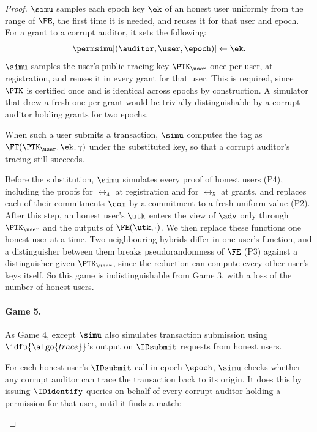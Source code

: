 \begin{proof}
  $\simu$ samples each epoch key $\ek$ of an honest user uniformly from the
range of $\FE$, the first time it is needed, and reuses it for that user and
epoch. For a grant to a corrupt auditor, it sets the following:
  \begin{equation*}
    \permsimu[(\auditor,\user,\epoch)] \leftarrow \ek.
  \end{equation*}
  $\simu$ samples the user's public tracing key $\PTK_\user$ once per user, at
registration, and reuses it in every grant for that user. This is required, since
$\PTK$ is certified once and is identical across epochs by construction. A
simulator that drew a fresh one per grant would be trivially distinguishable by a
corrupt auditor holding grants for two epochs.

  When such a user submits a transaction, $\simu$ computes the tag as
$\FT(\PTK_\user,\ek,\gamma)$ under the substituted key, so that a corrupt
auditor's tracing still succeeds.

  Before the substitution, $\simu$ simulates every proof of honest users (P4),
including the proofs for $\rel_4$ at registration and for $\rel_5$ at grants,
and replaces each of their commitments $\com$ by a commitment to a fresh
uniform value (P2). After this step, an honest user's $\utk$ enters the view of
$\adv$ only through $\PTK_\user$ and the outputs of $\FE(\utk,\cdot)$. We then
replace these functions one honest user at a time. Two neighbouring hybrids
differ in one user's function, and a distinguisher between them breaks
pseudorandomness of $\FE$ (P3) against a distinguisher given $\PTK_\user$,
since the reduction can compute every other user's keys itself. So this game is
indistinguishable from Game 3, with a loss of the number of honest
users.

  \paragraph{Game 5.} As Game 4, except $\simu$ also simulates transaction
submission using $\idfu{\algo{trace}}$'s output on $\IDsubmit$ requests from
honest users.

  For each honest user's $\IDsubmit$ call in epoch $\epoch$, $\simu$ checks
whether any corrupt auditor can trace the transaction back to its origin. It
does this by issuing $\IDidentify$ queries on behalf of every corrupt auditor
holding a permission for that user, until it finds a match:

  \begin{enumerate}


\end{enumerate}
\end{proof}

